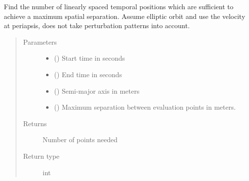 \documentclass[letterpaper,10pt,english]{sphinxmanual}
\begin{document}
\begin{fulllineitems}
\label{\detokenize{modules/simulate_tracking:simulate_tracking.find_linspace_num}}
Find the number of linearly spaced temporal positions which are sufficient to achieve a maximum spatial separation.
Assume elliptic orbit and use the velocity at periapsis, does not take perturbation patterns into account.
\begin{quote}\begin{description}
\item[{Parameters}] \leavevmode\begin{itemize}
\item {} 
 () \textendash{} Start time in seconds

\item {} 
 () \textendash{} End time in seconds

\item {} 
 () \textendash{} Semi-major axis in meters

\item {} 
 () \textendash{} Maximum separation between evaluation points in meters.

\end{itemize}

\item[{Returns}] \leavevmode
Number of points needed

\item[{Return type}] \leavevmode
int

\end{description}\end{quote}

\end{fulllineitems}

\end{document}
